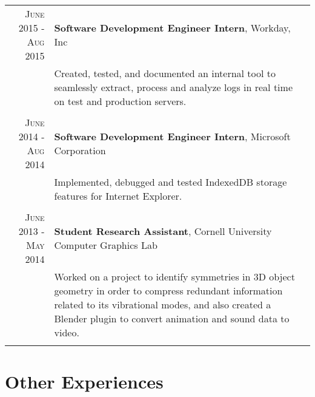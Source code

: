 \documentclass[a4paper,10pt]{article} %
\begin{document}
\begin{tabular}{rp{11.8cm}}
\textsc{June 2015 - Aug 2015} & \textbf{Software Development Engineer Intern}, Workday, Inc\\
& \small{Created, tested, and documented an internal tool to seamlessly extract, process and analyze logs in real time on test and production servers.}\\
\multicolumn{2}{c}{} \\


\textsc{June 2014 - Aug 2014} & \textbf{Software Development Engineer Intern}, Microsoft Corporation\\
& \small{Implemented, debugged and tested IndexedDB storage features for Internet Explorer.}\\
\multicolumn{2}{c}{} \\


\textsc{June 2013 - May 2014} & \textbf{Student Research Assistant}, Cornell University Computer Graphics Lab\\
& \small{Worked on a project to identify symmetries in 3D object geometry in order to compress redundant information related to its vibrational modes, and also created a Blender plugin to convert animation and sound data to video.}\\
\multicolumn{2}{c}{} \\

\end{tabular}


\section{Other Experiences}
\end{document}
